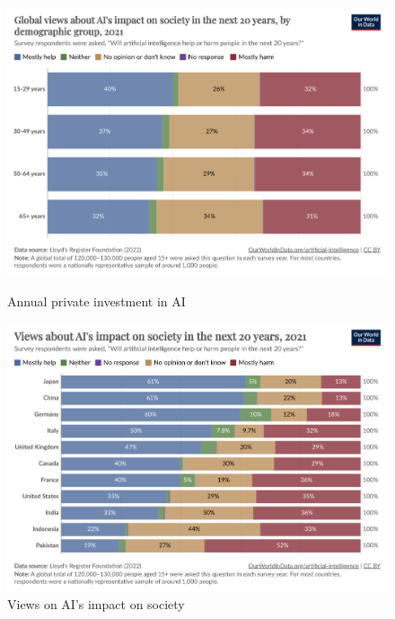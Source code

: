 \documentclass[paper=a4, fontsize=11pt]{scrartcl} %
\numberwithin{equation}{section} %
\numberwithin{figure}{section} %
\numberwithin{table}{section} %
\begin{document}
\begin{figure}[htbp]
    \centering
    \begin{minipage}[t]{0.48\linewidth}
        \includegraphics[width=\linewidth]{./data/influence_by_ages.png}
        \caption{Annual private investment in AI}
        \label{fig:investment}
    \end{minipage}\hfill
    \begin{minipage}[t]{0.48\linewidth}
        \includegraphics[width=\linewidth]{./data/influence.png}
        \caption{Views on AI's impact on society}
        \label{fig:views_ai_impact}
    \end{minipage}
\end{figure}


\end{document}
